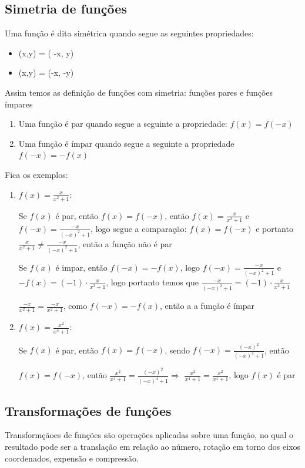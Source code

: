 \begin{multicols*}{2}
    \subsection{Simetria de funções}
    Uma função é dita simétrica quando segue as seguintes propriedades:
    \begin{itemize}
        \item (x,y) = ( -x, y)
        \item (x,y) = (-x, -y)
    \end{itemize}
    Assim temos as definição de funções com simetria: funções pares e funções ímpares
    \begin{enumerate}
        \item Uma função é par quando segue a seguinte a propriedade: $f(x) = f(-x)$
        \item Uma função é ímpar quando segue a seguinte a propriedade $f(-x) = -f(x)$
    \end{enumerate}
    Fica os exemplos:
    \begin{enumerate}[wide, labelwidth=!, labelindent=0pt]
        \item $	f(x) = \frac{x}{x^2 + 1} $:

              Se $f(x)$ é par, então $f(x) = f(-x)$, então $f(x) = \frac{x}{x^2 +1 }$ e
              $f(-x) = \frac{-x}{(-x)^2 +1}$, logo segue a comparação: $f(x) = f(-x)$ e portanto
              $\frac{x}{x^2 +1 } \ne \frac{ -x}{ (-x)^2 +1}$, então a função não é par

              Se $f(x)$ é impar, então $f(-x) = -f(x)$, logo $f(-x) = \frac{-x}{(-x)^2 +1}$ e
              $-f(x) = (-1) \cdot \frac{x}{x^2 +1}$, logo portanto temos que
              $\frac{-x}{(-x)^2 +1} = (-1) \cdot \frac{x}{x^2 +1} $

              $\frac{-x}{x^2 +1} = \frac{-x}{x^2 +1} $, como $f(-x) = -f(x)$, então a a função é
              ímpar

        \item $f(x) = \frac{x^2}{x^4 +1}$:

              Se $f(x)$ é par, então $f(x) = f(-x)$, sendo $f(-x) = \frac{(-x)^2}{(-x)^4 + 1}$, então

              $f(x) = f(-x)$, então $ \frac{x^2}{x^4 +1} = \frac{(-x)^2}{(-x)^4 + 1} \Rightarrow$
              $\frac{x^2}{x^4 +1} = \frac{x^2}{x^4 + 1}$, logo $f(x)$ é par

    \end{enumerate}

    \subsection{Transformações de funções}
    Transformçãoes de funções são operações aplicadas sobre uma função, no qual o  resultado pode 			ser a translação em relação ao número, rotação em torno dos eixos coordenados, expensão e 				compressão.


\end{multicols*}
